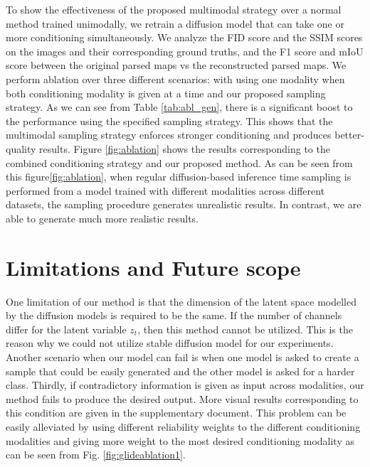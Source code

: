 \documentclass[10pt,twocolumn,letterpaper]{article}
\begin{document}
\begin{table}[t!]
\centering
{}
\caption{Analyzing advantage of the proposed sampling method over normal training and regular sampling techniques.}
\label{tab:abl_gen}
\vspace{-8mm}
\end{table}
 To show the effectiveness of the proposed multimodal strategy over a normal method trained unimodally, we retrain a diffusion model that can take one or more conditioning simultaneously. We analyze the FID score and the SSIM scores on the images and their corresponding ground truths,  and the F1 score and mIoU score between the original parsed maps vs the reconstructed parsed maps. We perform ablation over three different scenarios: with using one modality when both conditioning modality is given at a time and our proposed sampling strategy. As we can see from Table \ref{tab:abl_gen}, there is a significant boost to the performance using the specified sampling strategy. This shows that the multimodal sampling strategy enforces stronger conditioning and produces better-quality results. Figure \ref{fig:ablation} shows the results corresponding to the combined conditioning strategy and our proposed method. As can be seen from this figure\ref{fig:ablation}, when regular diffusion-based inference time sampling is performed from a model trained with different modalities across different datasets, the sampling procedure generates unrealistic results. In contrast, we are able to generate much more realistic results.

\section{Limitations and Future scope}


One limitation of our method is that the dimension of the latent space modelled by the diffusion models is required to be the same. If the number of channels differ for the latent variable $z_t$, then this method cannot be utilized. This is the reason why we could not utilize stable diffusion model \cite{rombach2022high} for our experiments. Another scenario when our model can fail is when one model is asked to create a sample that could be easily generated and the other model is asked for a harder class. Thirdly, if contradictory information is given as input across modalities, our method fails to produce the desired output. More visual results corresponding to this condition are given in the supplementary document. This problem can be easily alleviated by using different reliability weights to the different conditioning modalities and giving more weight to the most desired conditioning modality as can be seen from Fig.  \ref{fig:glideablation1}. 
\end{document}
